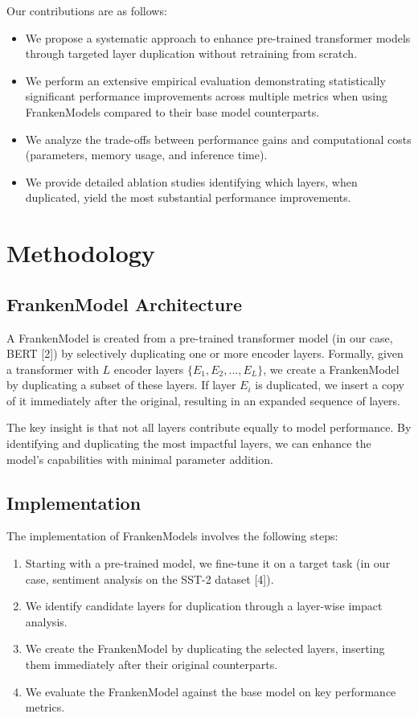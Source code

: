 \documentclass{article}
\begin{document}
Our contributions are as follows:
\begin{itemize}
    \item We propose a systematic approach to enhance pre-trained transformer models through targeted layer duplication without retraining from scratch.
    \item We perform an extensive empirical evaluation demonstrating statistically significant performance improvements across multiple metrics when using FrankenModels compared to their base model counterparts.
    \item We analyze the trade-offs between performance gains and computational costs (parameters, memory usage, and inference time).
    \item We provide detailed ablation studies identifying which layers, when duplicated, yield the most substantial performance improvements.
\end{itemize}

\section{Methodology}

\subsection{FrankenModel Architecture}
A FrankenModel is created from a pre-trained transformer model (in our case, BERT [2]) by selectively duplicating one or more encoder layers. Formally, given a transformer with $L$ encoder layers $\{E_1, E_2, ..., E_L\}$, we create a FrankenModel by duplicating a subset of these layers. If layer $E_i$ is duplicated, we insert a copy of it immediately after the original, resulting in an expanded sequence of layers.

The key insight is that not all layers contribute equally to model performance. By identifying and duplicating the most impactful layers, we can enhance the model's capabilities with minimal parameter addition.

\subsection{Implementation}
The implementation of FrankenModels involves the following steps:
\begin{enumerate}
    \item Starting with a pre-trained model, we fine-tune it on a target task (in our case, sentiment analysis on the SST-2 dataset [4]).
    \item We identify candidate layers for duplication through a layer-wise impact analysis.
    \item We create the FrankenModel by duplicating the selected layers, inserting them immediately after their original counterparts.
    \item We evaluate the FrankenModel against the base model on key performance metrics.
\end{enumerate}
\end{document}
